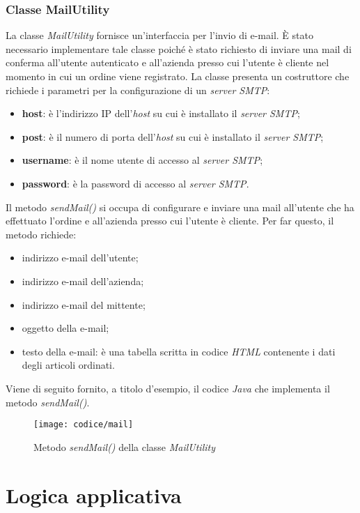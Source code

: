 \subsubsection{Classe MailUtility}

La classe \textit{MailUtility} fornisce un'interfaccia per l'invio di e-mail. È stato necessario implementare tale classe poiché è stato richiesto di inviare una mail di conferma all'utente autenticato e all'azienda presso cui l'utente è cliente nel momento in cui un ordine viene registrato. La classe presenta un costruttore che richiede i parametri per la configurazione di un \textit{server SMTP}:
\begin{itemize}
	\item \textbf{host}: è l'indirizzo IP dell'\textit{host} su cui è installato il \textit{server SMTP};
	\item \textbf{post}: è il numero di porta dell'\textit{host} su cui è installato il \textit{server SMTP};
	\item \textbf{username}: è il nome utente di accesso al \textit{server SMTP};
	\item \textbf{password}: è la password di accesso al \textit{server SMTP}.
\end{itemize}
Il metodo \textit{sendMail()} si occupa di configurare e inviare una mail all'utente che ha effettuato l'ordine e all'azienda presso cui l'utente è cliente. Per far questo, il metodo richiede:
\begin{itemize}
	\item indirizzo e-mail dell'utente;
	\item indirizzo e-mail dell'azienda;
	\item indirizzo e-mail del mittente;
	\item oggetto della e-mail;
	\item testo della e-mail: è una tabella scritta in codice \textit{HTML} contenente i dati degli articoli ordinati.
\end{itemize}
Viene di seguito fornito, a titolo d'esempio, il codice \textit{Java} che implementa il metodo \textit{sendMail()}.

\newpage

\begin{figure}[!h] 
    \centering 
    \texttt{[image: codice/mail]} 
    \caption{Metodo \textit{sendMail()} della classe \textit{MailUtility}}
\end{figure}

\section{Logica applicativa}

